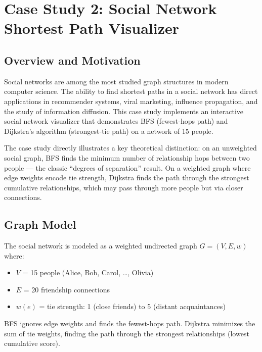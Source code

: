 \documentclass[12pt, a4paper, oneside]{report}
\theoremstyle{definition}
\begin{document}
\chapter{Case Study 2: Social Network Shortest Path Visualizer}

\section{Overview and Motivation}

Social networks are among the most studied graph structures in modern computer science. The ability to find shortest paths in a social network has direct applications in recommender systems, viral marketing, influence propagation, and the study of information diffusion. This case study implements an interactive social network visualizer that demonstrates BFS (fewest-hops path) and Dijkstra's algorithm (strongest-tie path) on a network of 15 people.

The case study directly illustrates a key theoretical distinction: on an unweighted social graph, BFS finds the minimum number of relationship hops between two people — the classic ``degrees of separation'' result. On a weighted graph where edge weights encode tie strength, Dijkstra finds the path through the strongest cumulative relationships, which may pass through more people but via closer connections.

\section{Graph Model}

The social network is modeled as a weighted undirected graph $G = (V, E, w)$ where:
\begin{itemize}
    \item $V$ = 15 people (Alice, Bob, Carol, \ldots, Olivia)
    \item $E$ = 20 friendship connections
    \item $w(e)$ = tie strength: 1 (close friends) to 5 (distant acquaintances)
\end{itemize}

BFS ignores edge weights and finds the fewest-hops path. Dijkstra minimizes the sum of tie weights, finding the path through the strongest relationships (lowest cumulative score).
\end{document}
